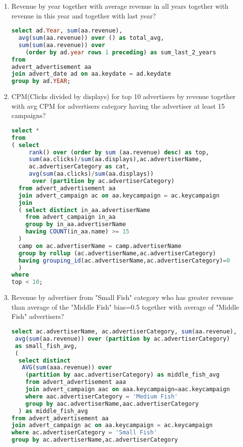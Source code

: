 \begin{enumerate}
\item Revenue by year together with average revenue in all years together with revenue in this year and together with last year?
\begin{lstlisting}[language=sql] 
select ad.Year, sum(aa.revenue), 
  avg(sum(aa.revenue)) over () as total_avg,
  sum(sum(aa.revenue)) over 
    (order by ad.year rows 1 preceding) as sum_last_2_years
from   
advert_advertisement aa
join advert_date ad on aa.keydate = ad.keydate
group by ad.YEAR;
\end{lstlisting}
\item    CPM(Clicks divided by displays) for top 10 advertisers by revenue together with avg CPM for advertisers category having the advertiser at least 15 campaigns?
\begin{lstlisting}[language=sql] 
select *
from 
( select
     rank() over (order by sum (aa.revenue) desc) as top,
     sum(aa.clicks)/sum(aa.displays),ac.advertiserName,
     ac.advertiserCategory as cat, 
     avg(sum(aa.clicks)/sum(aa.displays)) 
      over (partition by ac.advertiserCategory)
  from advert_advertisement aa
  join advert_campaign ac on aa.keycampaign = ac.keycampaign
  join
  ( select distinct in_aa.advertiserName 
    from advert_campaign in_aa
    group by in_aa.advertiserName
    having COUNT(in_aa.name) >= 15
  )
  camp on ac.advertiserName = camp.advertiserName
  group by rollup (ac.advertiserName,ac.advertiserCategory) 
  having grouping_id(ac.advertiserName,ac.advertiserCategory)=0
  )
where 
top < 10;
\end{lstlisting}
\item Revenue by advertiser from "Small Fish" category who has greater revenue than average of the "Middle Fish" bias=0.5 together with average of "Middle Fish" advertisers? 
  \begin{lstlisting}[language=sql] 
select ac.advertiserName, ac.advertiserCategory, sum(aa.revenue), 
 avg(sum(aa.revenue)) over (partition by ac.advertiserCategory) 
 as small_fish_avg,
 ( 
  select distinct
   AVG(sum(aaa.revenue)) over 
    (partition by aac.advertiserCategory) as middle_fish_avg
    from advert_advertisement aaa 
    join advert_campaign aac on aaa.keycampaign=aac.keycampaign
    where aac.advertiserCategory = 'Medium Fish'   
    group by aac.advertiserName,aac.advertiserCategory
  ) as middle_fish_avg
from advert_advertisement aa
join advert_campaign ac on aa.keycampaign = ac.keycampaign
where ac.advertiserCategory = 'Small Fish'
group by ac.advertiserName,ac.advertiserCategory

\end{lstlisting}
\end{enumerate}
